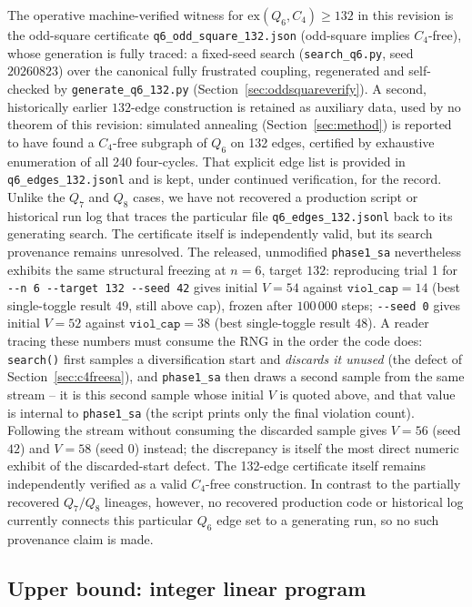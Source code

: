 \documentclass[12pt,a4paper]{article}
\theoremstyle{definition}
\newcommand{\ex}{\mathrm{ex}}
\begin{document}
The operative machine-verified witness for $\ex(Q_6,C_4)\ge132$ in this
revision is the odd-square certificate \texttt{q6\_odd\_square\_132.json}
(odd-square implies $C_4$-free), whose generation is fully traced: a
fixed-seed search (\texttt{search\_q6.py}, seed $20260823$) over the
canonical fully frustrated coupling, regenerated and self-checked by
\texttt{generate\_q6\_132.py} (Section~\ref{sec:oddsquareverify}). A second,
historically earlier $132$-edge construction is retained as auxiliary data,
used by no theorem of this revision: simulated annealing
(Section~\ref{sec:method}) is reported to have found a $C_4$-free subgraph of
$Q_6$ on 132 edges, certified by exhaustive enumeration of all 240 four-cycles.
That explicit edge list is provided in \texttt{q6\_edges\_132.jsonl} and is
kept, under continued verification, for the record. Unlike the $Q_7$ and $Q_8$ cases, we have not recovered a production script
or historical run log that traces the particular file
\texttt{q6\_edges\_132.jsonl} back to its generating search. The certificate
itself is independently valid, but its search provenance remains unresolved.
The released, unmodified \texttt{phase1\_sa} nevertheless exhibits the same structural
freezing at $n=6$, target $132$: reproducing trial 1 for
\texttt{-{}-n 6 -{}-target 132 -{}-seed 42} gives initial $V=54$
against $\texttt{viol\_cap}=14$ (best single-toggle result $49$, still
above cap), frozen after $100\,000$ steps; \texttt{-{}-seed 0} gives
initial $V=52$ against $\texttt{viol\_cap}=38$ (best single-toggle
result $48$). A reader tracing these numbers must consume the RNG in the
order the code does: \texttt{search()} first samples a diversification start
and \emph{discards it unused} (the defect of Section~\ref{sec:c4freesa}),
and \texttt{phase1\_sa} then draws a second sample from the same stream --
it is this second sample whose initial $V$ is quoted above, and that value is
internal to \texttt{phase1\_sa} (the script prints only the final violation
count). Following the stream without consuming the discarded sample gives
$V=56$ (seed $42$) and $V=58$ (seed $0$) instead; the discrepancy is itself
the most direct numeric exhibit of the discarded-start defect. The 132-edge certificate itself remains independently verified as a valid
$C_4$-free construction. In contrast to the partially recovered $Q_7/Q_8$
lineages, however, no recovered production code or historical log currently
connects this particular $Q_6$ edge set to a generating run, so no such
provenance claim is made.

\subsection{Upper bound: integer linear program}\label{sec:q6upper}
\end{document}
